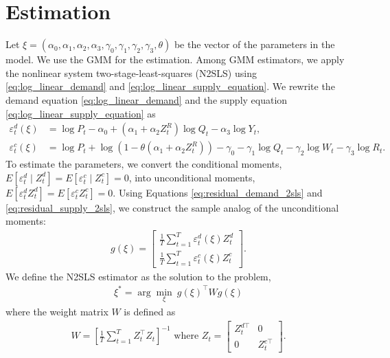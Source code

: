 \documentclass[11pt, a4paper]{article}
\theoremstyle{remark}
\begin{document}
\section{Estimation}
Let $\xi = (\alpha_0,\alpha_1, \alpha_2, \alpha_3, \gamma_0,\gamma_1, \gamma_2, \gamma_3, \theta)$ be the vector of the parameters in the model. 
We use the GMM for the estimation.
Among GMM estimators, we apply the nonlinear system two-stage-least-squares (N2SLS) using \eqref{eq:log_linear_demand} and \eqref{eq:log_linear_supply_equation}.
We rewrite the demand equation \eqref{eq:log_linear_demand} and the supply equation \eqref{eq:log_linear_supply_equation} as
\begin{align}
    {\varepsilon}_t^d(\xi) & =  \log P_{t} - \alpha_0 + (\alpha_1 + \alpha_2 Z^{R}_{t}) \log Q_t - \alpha_3 \log Y_t \label{eq:residual_demand_2sls}, \\
    {\varepsilon}_t^c(\xi) & =  \log P_t + \log(1 - \theta(\alpha_1 + \alpha_2 Z^{R}_{t})) -\gamma_0 - \gamma_1 \log Q_t -  \gamma_2 \log W_{t} -\gamma_3 \log R_t \label{eq:residual_supply_2sls}.
\end{align}
To estimate the parameters, we convert the conditional moments, $E[\varepsilon_t^d\mid Z_t^d] = E[\varepsilon_t^c\mid Z_t^c]=0$, into unconditional moments, $E[\varepsilon_t^d Z_t^d] = E[\varepsilon_t^cZ_t^c]=0$.
Using Equations \eqref{eq:residual_demand_2sls} and \eqref{eq:residual_supply_2sls}, we construct the sample analog of the unconditional moments:
\begin{align*}
    g(\xi) = \left[\begin{array}{l}
    \frac{1}{T}\sum_{t=1}^T{\varepsilon}^{d}_{t}(\xi)Z_{t}^{d} \\
    \frac{1}{T}\sum_{t=1}^T{\varepsilon}^{c}_{t}(\xi)Z_{t}^{c}
    \end{array}\right].
\end{align*}
We define the N2SLS estimator as the solution to the problem,
\begin{align}
     \xi^* = \arg \min_{\xi}\ g(\xi)^\top W g(\xi) \label{eq:minimization_gmm}
\end{align}
where the weight matrix $W$ is defined as
\begin{align}
    W = \left[\frac{1}{T}\sum_{t = 1}^T Z_t^\top Z_t\right]^{-1} \text{ where } Z_{t}=\left[\begin{array}{ll}
        Z_{t}^{d\top} & 0 \\
        0 & Z_{t}^{c\top}
    \end{array}\right].\label{eq:weight_matrix}
\end{align}
\end{document}
